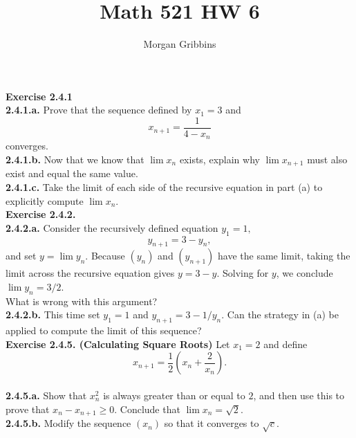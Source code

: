 \documentclass[12pt,letterpaper]{article}
\title{Math 521 HW 6}
\author{Morgan Gribbins}
\date{}
\begin{document}
	
\maketitle

\textbf{Exercise 2.4.1} \\

\textbf{2.4.1.a.} Prove that the sequence defined by \(x_{1} = 3\) and \[x_{n+1} = \frac{1}{4-x_{n}}\] converges. \\



\textbf{2.4.1.b.} Now that we know that \(\lim x_{n}\) exists, explain why \(\lim x_{n+1}\) must also exist and equal the same value. \\



\textbf{2.4.1.c.} Take the limit of each side of the recursive equation in part (a) to explicitly compute \(\lim x_{n}\). \\



\textbf{Exercise 2.4.2.} \\

\textbf{2.4.2.a.} Consider the recursively defined equation \(y_{1} = 1,\) \[y_{n+1} = 3-y_{n},\] and set \(y = \lim y_{n}\). Because \((y_{n})\) and \((y_{n+1})\) have the same limit, taking the limit across the recursive equation gives \(y = 3 - y.\) Solving for \(y\), we conclude \(\lim y_{n} = 3/2\). \\
What is wrong with this argument? \\



\textbf{2.4.2.b.} This time set \(y_{1} = 1\) and \(y_{n+1} = 3 - 1/y_{n}\). Can the strategy in (a) be applied to compute the limit of this sequence? \\



\textbf{Exercise 2.4.5. (Calculating Square Roots)} Let \(x_{1} = 2\) and define \[x_{n+1} = \frac{1}{2}\left(x_{n} + \frac{2}{x_{n}}\right).\] \\

\textbf{2.4.5.a.} Show that \(x_{n}^{2}\) is always greater than or equal to \(2\), and then use this to prove that \(x_{n} - x_{n+1} \geq 0\). Conclude that \(\lim x_{n} = \sqrt{2}\). \\



\textbf{2.4.5.b.} Modify the sequence \((x_{n})\) so that it converges to \(\sqrt{c}\). \\
\end{document}
